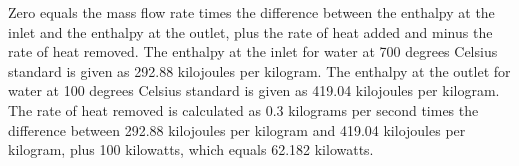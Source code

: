 Zero equals the mass flow rate times the difference between the enthalpy at the inlet and the enthalpy at the outlet, plus the rate of heat added and minus the rate of heat removed. The enthalpy at the inlet for water at 700 degrees Celsius standard is given as 292.88 kilojoules per kilogram. The enthalpy at the outlet for water at 100 degrees Celsius standard is given as 419.04 kilojoules per kilogram. The rate of heat removed is calculated as 0.3 kilograms per second times the difference between 292.88 kilojoules per kilogram and 419.04 kilojoules per kilogram, plus 100 kilowatts, which equals 62.182 kilowatts.